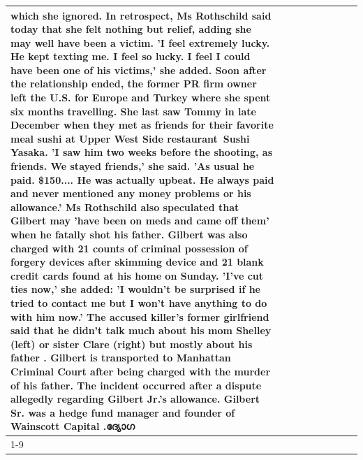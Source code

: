 \begin{table}[H]
\begin{tabular}{lllrlllll}
which she ignored. In retrospect, Ms Rothschild said today that she felt nothing but relief, adding she may well have been a victim. 'I feel extremely lucky. He kept texting me. I feel so lucky. I feel I could have been one of his victims,' she added. Soon after the relationship ended, the former PR firm owner left the U.S. for Europe and Turkey where she spent six months  travelling. She last saw Tommy in late December when they met as friends for their favorite meal sushi at Upper West Side restaurant Sushi Yasaka. 'I saw him two weeks before the shooting, as friends. We stayed friends,' she said. 'As usual he paid. \$150.... He was actually upbeat. He always paid and never mentioned any money problems or his allowance.' Ms Rothschild also speculated that Gilbert may 'have been on meds and came off them' when he fatally shot his father. Gilbert was also charged with 21 counts of criminal possession of forgery devices after skimming device and 21 blank credit cards found at his home on Sunday. 'I've cut ties now,' she added: 'I wouldn’t be surprised if he tried to contact me but I won’t have anything to do with him now.' The accused killer's former girlfriend said that he didn't talk much about his mom Shelley (left) or sister Clare (right) but mostly about his father . Gilbert is transported to Manhattan Criminal Court  after being charged with the murder of his father. The incident occurred after a dispute allegedly regarding Gilbert Jr.'s allowance. Gilbert Sr. was a hedge fund manager and founder of Wainscott Capital .ദ്യോഗ \\
\cline{1-9}

\end{tabular}
\end{table}
